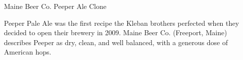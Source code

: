 \begin{recipie}{Maine Beer Co. Peeper Ale Clone}

\begin{aboutblock}
Peeper Pale Ale was the first recipe the Kleban brothers perfected when they
decided to open their brewery in 2009. Maine Beer Co. (Freeport, Maine) describes
Peeper as dry, clean, and well balanced, with a generous dose of American hops.
\sourceaha
\end{aboutblock}


\begin{methodandtiming}
 
\begin{mashsteps}
\end{mashsteps}

\begin{fermentationsteps}
\end{fermentationsteps}

\end{methodandtiming}

\pagebreak

\begin{ingredientsblock}

\begin{malts}
\end{malts}

\begin{hops}
\end{hops}


\end{ingredientsblock}

\end{recipie}

